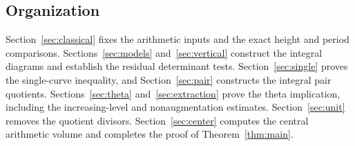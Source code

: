 \subsection{Organization}

Section~\ref{sec:classical} fixes the arithmetic inputs and the exact
height and period comparisons. Sections~\ref{sec:models}
and~\ref{sec:vertical} construct the integral diagrams and establish
the residual determinant tests. Section~\ref{sec:single} proves the
single-curve inequality, and Section~\ref{sec:pair} constructs the
integral pair quotients. Sections~\ref{sec:theta}
and~\ref{sec:extraction} prove the theta implication, including the
increasing-level and nonaugmentation estimates.
Section~\ref{sec:unit} removes the quotient divisors.
Section~\ref{sec:center} computes the central arithmetic volume and
completes the proof of Theorem~\ref{thm:main}.
